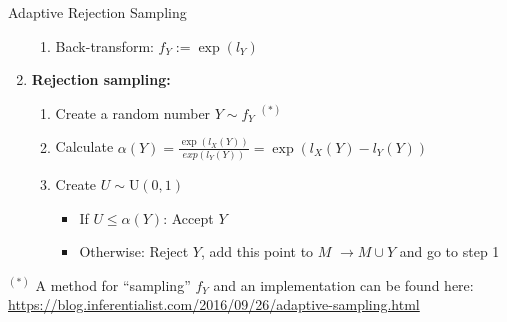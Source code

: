 \begin{vbframe}{Adaptive Rejection Sampling}
\begin{enumerate}
\begin{enumerate}

\item Back-transform: $f_Y := \exp(l_Y)$

\framebreak


\end{enumerate}
\item \textbf{Rejection sampling:}
\begin{enumerate}
\item Create a random number $Y \sim f_Y$ $^{(*)}$
\item Calculate $ \alpha(Y) = \frac{\exp(l_X(Y))}{exp(l_Y(Y))} = \exp(l_X(Y) - l_Y(Y) )$
\item Create $U \sim \text{U}(0, 1)$
\begin{itemize}
\item If $U \le \alpha(Y)$: Accept $Y$
\item Otherwise: Reject $Y$, add this point to $M$ $\to M \cup Y$ and go to step 1
\end{itemize}

\end{enumerate}
\end{enumerate}

\vfill

\begin{footnotesize}
$^{(*)}$ A method for \enquote{sampling} $f_Y$ and an implementation can be found here: \\
\url{https://blog.inferentialist.com/2016/09/26/adaptive-sampling.html}
\end{footnotesize}

%
%


%
\end{vbframe}


